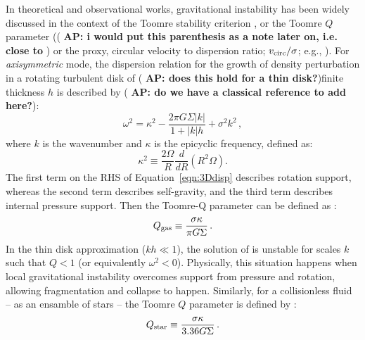 \IfFileExists{emulateapjlegacy.cls}{\documentclass[iop]{emulateapjlegacy}}{\documentclass[iop]{emulateapj}}
\newcommand{\AP}[1]{({\bf \color{apcolor} AP: #1})}
\begin{document}
In theoretical and observational works, gravitational instability has been widely discussed in the context of the Toomre stability criterion \citep{Toomre64a, Goldreich65b}, or the Toomre $Q$ parameter (\AP{i would put this parenthesis as a note later on, i.e. close to \Eq{q_eff}} or the proxy, circular velocity to dispersion ratio; $v_{\rm circ}/\sigma$; e.g., \citealt{GarciaBurillo03a, Genzel11a, Kassin12a, Leung19a}).
%
For {\it axisymmetric} mode, the dispersion relation for the growth of density perturbation in a rotating turbulent disk of \AP{does this hold for a thin disk?}finite thickness $h$ is described by \AP{do we have a classical reference to add here?}:
\begin{equation}
\omega^2 = \kappa^2 - \frac{2\pi G \Sigma |k|}{1 + |k| h} + \sigma^2 k^2\,,
\label{eqn:3Ddisp}
\end{equation}
where $k$ is the wavenumber and $\kappa$ is the epicyclic frequency, defined as:
\begin{equation}
\kappa^2\equiv\frac{2\Omega}{R}\frac{d}{dR}\left(R^2\Omega\right).
\label{eqn:kappa}
\end{equation}
The first term on the RHS of Equation~\ref{eqn:3Ddisp} describes rotation support, whereas the second term describes self-gravity, and the third term describes internal pressure support. Then the Toomre-Q parameter can be defined as \citep{Toomre64a}:
\begin{equation}
Q_{\rm gas}\equiv\frac{\sigma\kappa}{\pi G \Sigma}\,.
\label{eqn:Q}
\end{equation}
In the thin disk approximation ($kh\ll1$), the solution of  is unstable for scales $k$ such that $Q < 1$ (or equivalently $\omega^2 < 0$). Physically, this situation happens when local gravitational instability 
overcomes support from pressure and rotation, allowing fragmentation and collapse to happen.
Similarly, for a collisionless fluid -- as an ensamble of stars -- the Toomre $Q$ parameter is defined by \citep{Toomre64a}:
\begin{equation}
Q_{\rm star} \equiv\frac{\sigma\kappa}{3.36 G \Sigma}\,.
\end{equation}
\end{document}
